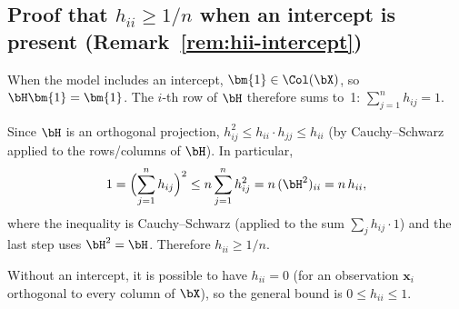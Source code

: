 \subsection{Proof that $h_{ii} \ge 1/n$ when an intercept is present (Remark~\ref{rem:hii-intercept})}

When the model includes an intercept, $\bm{1}\in\Col(\bX)$, so
$\bH\bm{1} = \bm{1}$. The $i$-th row of $\bH$ therefore sums to~1:
$\sum_{j=1}^n h_{ij} = 1$.

Since $\bH$ is an orthogonal projection, $h_{ij}^2 \le h_{ii}\cdot h_{jj} \le h_{ii}$
(by Cauchy--Schwarz applied to the rows/columns of $\bH$).  In particular,
\[
  1 = \Bigl(\sum_{j=1}^n h_{ij}\Bigr)^2
  \le n\sum_{j=1}^n h_{ij}^2
  = n\,(\bH^2)_{ii}
  = n\,h_{ii},
\]
where the inequality is Cauchy--Schwarz (applied to the sum $\sum_j h_{ij}\cdot 1$)
and the last step uses $\bH^2 = \bH$.
Therefore $h_{ii}\ge 1/n$.

Without an intercept, it is possible to have $h_{ii} = 0$ (for an observation
$\bm{x}_i$ orthogonal to every column of $\bX$), so the general bound is
$0 \le h_{ii} \le 1$.



